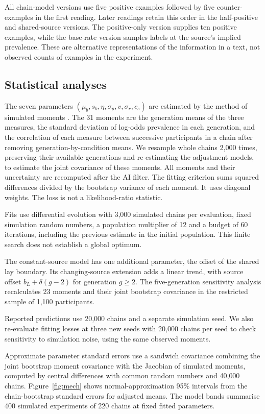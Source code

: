 \documentclass[11pt]{article}
\begin{document}
All chain-model versions use five positive examples followed by five counter-examples in the first reading. Later readings retain this order in the half-positive and shared-source versions. The positive-only version supplies ten positive examples, while the base-rate version samples labels at the source's implied prevalence. These are alternative representations of the information in a text, not observed counts of examples in the experiment.

\subsection{Statistical analyses}

The seven parameters $(\mu_b, s_b, \eta, \sigma_p, v, \sigma_r, c_s)$ are estimated by the method of simulated moments \citep{mcfadden1989}. The 31 moments are the generation means of the three measures, the standard deviation of log-odds prevalence in each generation, and the correlation of each measure between successive participants in a chain after removing generation-by-condition means. We resample whole chains 2{,}000 times, preserving their available generations and re-estimating the adjustment models, to estimate the joint covariance of these moments. All moments and their uncertainty are recomputed after the AI filter. The fitting criterion sums squared differences divided by the bootstrap variance of each moment. It uses diagonal weights. The loss is not a likelihood-ratio statistic.

Fits use differential evolution with 3{,}000 simulated chains per evaluation, fixed simulation random numbers, a population multiplier of 12 and a budget of 60 iterations, including the previous estimate in the initial population. This finite search does not establish a global optimum.

The constant-source model has one additional parameter, the offset of the shared lay boundary. Its changing-source extension adds a linear trend, with source offset $b_L+\delta(g-2)$ for generation $g\geq2$. The five-generation sensitivity analysis recalculates 23 moments and their joint bootstrap covariance in the restricted sample of 1{,}100 participants.

Reported predictions use 20{,}000 chains and a separate simulation seed. We also re-evaluate fitting losses at three new seeds with 20{,}000 chains per seed to check sensitivity to simulation noise, using the same observed moments.

Approximate parameter standard errors use a sandwich covariance combining the joint bootstrap moment covariance with the Jacobian of simulated moments, computed by central differences with common random numbers and 40{,}000 chains. Figure~\ref{fig:mech} shows normal-approximation 95\% intervals from the chain-bootstrap standard errors for adjusted means. The model bands summarise 400 simulated experiments of 220 chains at fixed fitted parameters.
\end{document}
